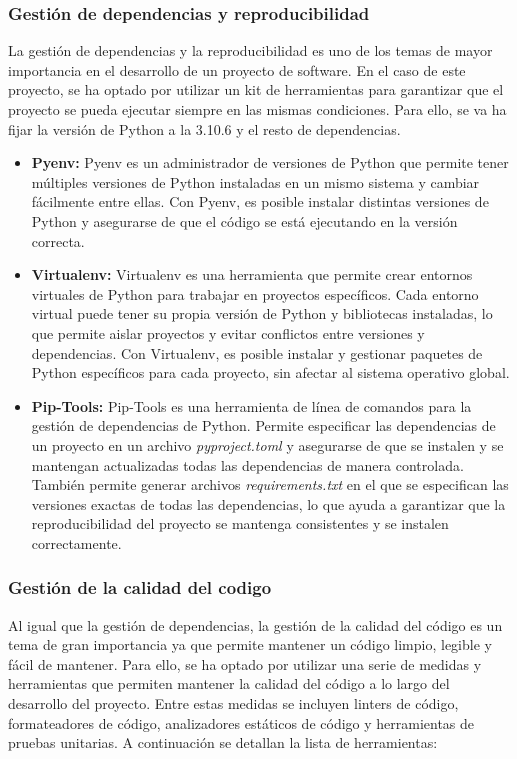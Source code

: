 \subsubsection{Gestión de dependencias y reproducibilidad}
La gestión de dependencias y la reproducibilidad es uno de los temas de mayor importancia en el 
desarrollo de un proyecto de software. En el caso de este proyecto, se ha optado por utilizar 
un kit de herramientas para garantizar que el proyecto se pueda ejecutar siempre en las mismas 
condiciones. Para ello, se va ha fijar la versión de Python a la 3.10.6 y el resto de dependencias. 

\begin{itemize}
    \item \textbf{Pyenv: } Pyenv \cite{pyenv} es un administrador 
    de versiones de Python que permite tener múltiples versiones de Python instaladas en un mismo sistema 
    y cambiar fácilmente entre ellas. Con Pyenv, es posible instalar distintas versiones de 
    Python y asegurarse de que el código se está ejecutando en la versión correcta. 
    
    \item \textbf{Virtualenv: } Virtualenv \cite{Virtualenv} es una herramienta que permite crear entornos virtuales de Python para trabajar 
    en proyectos específicos. Cada entorno virtual puede tener su propia versión de Python y bibliotecas instaladas, 
    lo que permite aislar proyectos y evitar conflictos entre versiones y dependencias. Con Virtualenv, 
    es posible instalar y gestionar paquetes de Python específicos para cada proyecto, sin afectar 
    al sistema operativo global.

    \item \textbf{Pip-Tools: } Pip-Tools \cite{Pip-tools} es una herramienta de línea de comandos para la gestión de 
    dependencias de Python. Permite especificar las dependencias de un proyecto en un archivo 
    \textit{pyproject.toml} y asegurarse de que se instalen y se mantengan actualizadas todas las dependencias 
    de manera controlada. También permite generar archivos \textit{requirements.txt} en el que se especifican las 
    versiones exactas de todas las dependencias, lo que ayuda a garantizar que la reproducibilidad del 
    proyecto se mantenga consistentes y se instalen correctamente.

\end{itemize}


\subsubsection{Gestión de la calidad del codigo}
Al igual que la gestión de dependencias, la gestión de la calidad del código es un tema de gran importancia
ya que permite mantener un código limpio, legible y fácil de mantener. Para ello, se ha optado por utilizar
una serie de medidas y herramientas que permiten mantener la calidad del código a lo largo del desarrollo del proyecto.
Entre estas medidas se incluyen linters de código, formateadores de código, analizadores estáticos de código y
herramientas de pruebas unitarias. A continuación se detallan la lista de herramientas:

